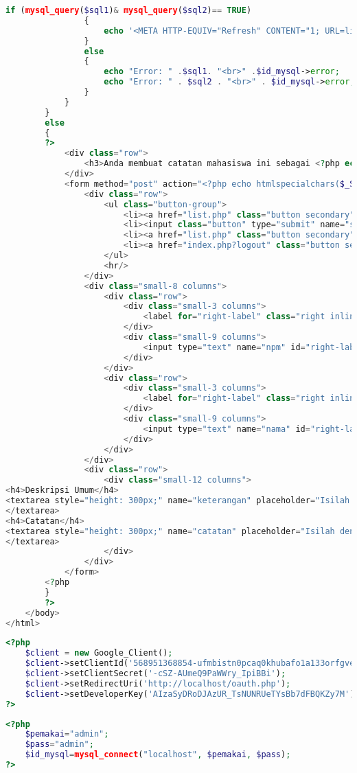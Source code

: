 \begin{lstlisting}[language=php,basicstyle=\tiny,caption=new.php]
				if (mysql_query($sql1)& mysql_query($sql2)== TRUE) 
				{
					echo '<META HTTP-EQUIV="Refresh" CONTENT="1; URL=list.php">';
				}
				else
				{
					echo "Error: " .$sql1. "<br>" .$id_mysql->error;
					echo "Error: " . $sql2 . "<br>" . $id_mysql->error;
				}
			}
		}
		else
		{
		?>
			<div class="row">
				<h3>Anda membuat catatan mahasiswa ini sebagai <?php echo $_SESSION['email']?>.</h3>
			</div>
			<form method="post" action="<?php echo htmlspecialchars($_SERVER["PHP_SELF"]);?>">
				<div class="row">
					<ul class="button-group">
						<li><a href="list.php" class="button secondary">Kembali</a></li>
						<li><input class="button" type="submit" name="submit" value="Simpan"></li>
						<li><a href="list.php" class="button secondary">Menu Utama</a></li>
						<li><a href="index.php?logout" class="button secondary">Logout</a></li>
					</ul>
					<hr/>
				</div>
				<div class="small-8 columns">
					<div class="row">
						<div class="small-3 columns">
							<label for="right-label" class="right inline">NPM</label>
						</div>
						<div class="small-9 columns">
							<input type="text" name="npm" id="right-label" placeholder="Masukan NPM">
						</div>
					</div>
					<div class="row">
						<div class="small-3 columns">
							<label for="right-label" class="right inline">Nama</label>
						</div>
						<div class="small-9 columns">
							<input type="text" name="nama" id="right-label" placeholder="Masukan nama">
						</div>
					</div>
				</div>
				<div class="row">
					<div class="small-12 columns">
<h4>Deskripsi Umum</h4>
<textarea style="height: 300px;" name="keterangan" placeholder="Isilah dengan deskripsi umum">
</textarea>
<h4>Catatan</h4>
<textarea style="height: 300px;" name="catatan" placeholder="Isilah dengan catatan mahasiswa">
</textarea>
					</div>
				</div>
			</form>
		<?php
		}
		?>
	</body>
</html>
\end{lstlisting}

\begin{lstlisting}[language=php,basicstyle=\tiny,caption=client.php]
<?php
	$client = new Google_Client();
	$client->setClientId('568951368854-ufmbistn0pcaq0khubafo1a133orfgve.apps.googleusercontent.com');
	$client->setClientSecret('-cSZ-AUmeQ9PaWWry_IpiBBi');
	$client->setRedirectUri('http://localhost/oauth.php'); 
	$client->setDeveloperKey('AIzaSyDRoDJAzUR_TsNUNRUeTYsBb7dFBQKZy7M');
?>
\end{lstlisting}

\begin{lstlisting}[language=php,basicstyle=\tiny,caption=configDatabase.php]
<?php
	$pemakai="admin";
	$pass="admin";
	$id_mysql=mysql_connect("localhost", $pemakai, $pass);
?>
\end{lstlisting}